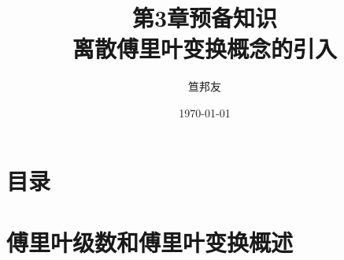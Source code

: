 \documentclass[notheorems,compress,mathserif,table]{beamer}
\title{\heiti 第3章预备知识 \\ 离散傅里叶变换概念的引入}
\author[\textcolor{blue}]{{\sihao\kaishu  笪邦友}}
\institute{\sihao\lishu  \textcolor{violet}{中南民族大学~~ 电子信息工程学院}}
\date{\fangsong\today}
\begin{document}
	\kaishu
	\frame{ \titlepage }
	\section*{目录}
%
%

\section{傅里叶级数和傅里叶变换概述}

%
\end{document}
